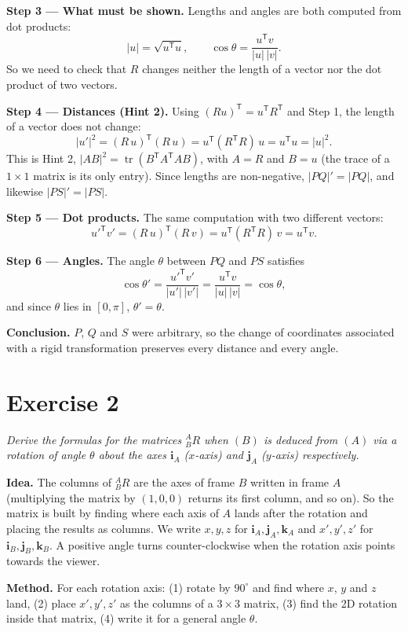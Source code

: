 \documentclass[11pt,a4paper]{article}
\newcommand{\T}{^{\mathsf{T}}}
\newcommand{\rot}{{}^{A}_{B}R}
\begin{document}
\textbf{Step 3 --- What must be shown.} Lengths and angles are both computed from dot products:
\[
|u| = \sqrt{u\T u}, \qquad \cos\theta = \frac{u\T v}{|u|\,|v|} .
\]
So we need to check that $R$ changes neither the length of a vector nor the dot product of two vectors.

\textbf{Step 4 --- Distances (Hint 2).} Using $(Ru)\T = u\T R\T$ and Step 1, the length of a vector does not change:
\[
|u'|^2 = (R\,u)\T (R\,u) = u\T (R\T R)\, u = u\T u = |u|^2 .
\]
This is Hint 2, $|AB|^2 = \operatorname{tr}(B\T A\T A B)$, with $A = R$ and $B = u$ (the trace of a $1\times1$ matrix is its only entry). Since lengths are non-negative, $|PQ|' = |PQ|$, and likewise $|PS|' = |PS|$.

\textbf{Step 5 --- Dot products.} The same computation with two different vectors:
\[
u'^{\mathsf{T}} v' = (R\,u)\T (R\,v) = u\T (R\T R)\, v = u\T v .
\]

\textbf{Step 6 --- Angles.} The angle $\theta$ between $PQ$ and $PS$ satisfies
\[
\cos\theta' = \frac{u'^{\mathsf{T}} v'}{|u'|\,|v'|} = \frac{u\T v}{|u|\,|v|} = \cos\theta ,
\]
and since $\theta$ lies in $[0, \pi]$, $\theta' = \theta$.

\textbf{Conclusion.} $P$, $Q$ and $S$ were arbitrary, so the change of coordinates associated with a rigid transformation preserves every distance and every angle.

\section*{Exercise 2}
\emph{Derive the formulas for the matrices $\rot$ when $(B)$ is deduced from $(A)$ via a rotation of angle $\theta$ about the axes $\mathbf{i}_A$ ($x$-axis) and $\mathbf{j}_A$ ($y$-axis) respectively.}

\textbf{Idea.} The columns of $\rot$ are the axes of frame $B$ written in frame $A$ (multiplying the matrix by $(1, 0, 0)$ returns its first column, and so on). So the matrix is built by finding where each axis of $A$ lands after the rotation and placing the results as columns. We write $x, y, z$ for $\mathbf{i}_A, \mathbf{j}_A, \mathbf{k}_A$ and $x', y', z'$ for $\mathbf{i}_B, \mathbf{j}_B, \mathbf{k}_B$. A positive angle turns counter-clockwise when the rotation axis points towards the viewer.

\textbf{Method.} For each rotation axis: (1) rotate by $90^\circ$ and find where $x$, $y$ and $z$ land, (2) place $x', y', z'$ as the columns of a $3\times3$ matrix, (3) find the 2D rotation inside that matrix, (4) write it for a general angle $\theta$.
\end{document}

